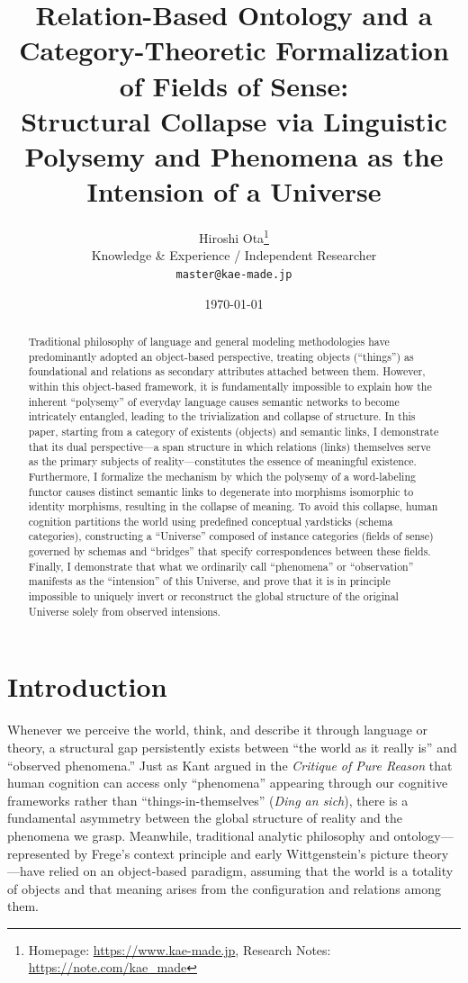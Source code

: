 \documentclass[11pt,a4paper]{article}
\title{\textbf{Relation-Based Ontology and a Category-Theoretic Formalization of Fields of Sense:} \\
\large Structural Collapse via Linguistic Polysemy and Phenomena as the Intension of a Universe}
\author{Hiroshi Ota\thanks{Homepage: \url{https://www.kae-made.jp}, Research Notes: \url{https://note.com/kae_made}} \\
\small Knowledge \& Experience / Independent Researcher \\
\small \texttt{master@kae-made.jp}}
\date{\today}
\theoremstyle{definition}
\theoremstyle{plain}
\begin{document}
\maketitle

\begin{abstract}
Traditional philosophy of language and general modeling methodologies have predominantly adopted an object-based perspective, treating objects (``things'') as foundational and relations as secondary attributes attached between them. However, within this object-based framework, it is fundamentally impossible to explain how the inherent ``polysemy'' of everyday language causes semantic networks to become intricately entangled, leading to the trivialization and collapse of structure. In this paper, starting from a category of existents (objects) and semantic links, I demonstrate that its dual perspective---a span structure in which relations (links) themselves serve as the primary subjects of reality---constitutes the essence of meaningful existence. Furthermore, I formalize the mechanism by which the polysemy of a word-labeling functor causes distinct semantic links to degenerate into morphisms isomorphic to identity morphisms, resulting in the collapse of meaning. To avoid this collapse, human cognition partitions the world using predefined conceptual yardsticks (schema categories), constructing a ``Universe'' composed of instance categories (fields of sense) governed by schemas and ``bridges'' that specify correspondences between these fields. Finally, I demonstrate that what we ordinarily call ``phenomena'' or ``observation'' manifests as the ``intension'' of this Universe, and prove that it is in principle impossible to uniquely invert or reconstruct the global structure of the original Universe solely from observed intensions.
\end{abstract}
\section{Introduction}

Whenever we perceive the world, think, and describe it through language or theory, a structural gap persistently exists between ``the world as it really is'' and ``observed phenomena.'' Just as Kant argued in the \textit{Critique of Pure Reason} \cite{kant1781} that human cognition can access only ``phenomena'' appearing through our cognitive frameworks rather than ``things-in-themselves'' (\textit{Ding an sich}), there is a fundamental asymmetry between the global structure of reality and the phenomena we grasp. Meanwhile, traditional analytic philosophy and ontology---represented by Frege's context principle \cite{frege1892} and early Wittgenstein's picture theory \cite{wittgenstein1921}---have relied on an object-based paradigm, assuming that the world is a totality of objects and that meaning arises from the configuration and relations among them.
\end{document}
